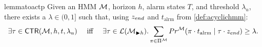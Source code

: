 \documentclass[runningheads]{llncs}
\newcommand{\sj}[2][]{\todo[color=red!50!white,#1]{\footnotesize{SJ: #2}}}
\newcommand{\lm}[2][]{\todo[color=cyan!50!white,#1]{\footnotesize{Luko: #2}}}
\newcommand{\talrm}{t_{\text{alrm}}}
\newcommand{\ig}{z_{\color{gray} ignore}\xspace}
\newcommand{\en}{z_{\color{black} end}\xspace}
\begin{document}
\begin{restatable}{lemma}{toactp}
    \label{lem:toactp}
    Given an HMM $\mathcal{M}$, horizon $h$, alarm states $T$, and threshold $\lambda_u$, there exists a $\lambda\in(0,1]$ such that, using $\en$ and $\talrm$ from \cref{def:acyclichmm}:
    \[ \exists \tau \in \mathsf{CTR}(\mc, h, t, \lambda_u) \quad\text{ iff }\quad \exists \tau \in \lang{\mc_{\blacktriangleright h}}. \sum_{\pi\in\Pi^\mc}\Prob^\mc(\pi \cdot \talrm \mid \tau \cdot \en) \geq \lambda.\]
\end{restatable}
%
%
\end{document}
